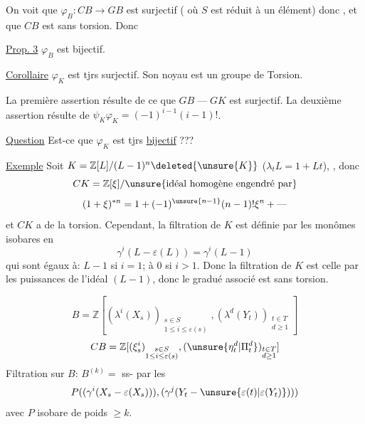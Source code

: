 On voit que $\varphi_B:CB\longrightarrow GB$ est surjectif ( où $S$ est réduit à un élément) donc  , et que $CB$ est sans torsion. Donc

\uline{Prop. 3} $\varphi_B$ est bijectif.

\uline{Corollaire} $\varphi_K$ est tjrs surjectif. Son noyau est un groupe de Torsion.

La première assertion résulte de ce que $GB\mathbin{\text{---}}GK$ est surjectif. La deuxième assertion résulte de $\psi_K\varphi_K=(-1)^{i-1}(i-1)!$.

\uline{Question} Est-ce que $\varphi_K$ est tjrs \uline{bijectif} ??? 

\uline{Exemple} Soit  $K=\mathbb Z[L]/(L-1)^n\deleted{\unsure{K}}$ ($\lambda_t L=1+Lt$), , donc
\[
CK=\mathbb Z[\xi]/\text{\unsure{idéal homogène engendré par}}
\]
\[
(1+\xi)^{*n}=1+(-1)^{\unsure{n-1}}(n-1)!\xi^n+\text{---}
\]
et $CK$ a de la torsion. Cependant,  la filtration de $K$ est définie par les monômes isobares en
\[
\gamma^i(L-\varepsilon(L))=\gamma^i(L-1)
\]
qui sont  égaux à: $L-1$ si $i=1$; à $0$ si $i>1$. Donc la filtration de $K$ est celle par les puissances de l'idéal  $(L-1)$, donc le gradué associé est sans torsion.


\[
B=\mathbb Z[(\lambda^i(X_s))_{\substack{s\in S\\1\leq i\leq\varepsilon(s)}},
(\lambda^d(Y_t))_{\substack{t\in T\\d\geq1}}]
\]
\[
CB=\mathbb Z[(\xi_s^i)_{\substack{s\in S\\1\leq i\leq\varepsilon(s)}},
(\unsure{\eta_t^d|\Pi_t^d})_{\substack{t\in T\\d\geq1}}]
\]
Filtration sur $B$:  $B^{(k)}=$ ss- par les
\[
P((\gamma^i(X_s-\varepsilon(X_s))),(\gamma^j(Y_t-\unsure{\varepsilon(t)|\varepsilon(Y_t)})))
\]
avec $P$  isobare de poids $\geq k$.

